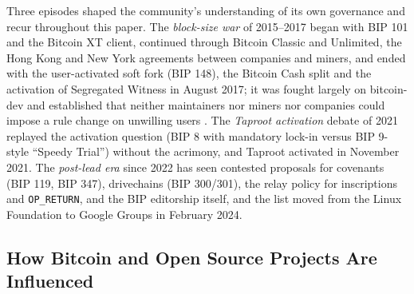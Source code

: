 \documentclass[sigconf,screen]{acmart}
\begin{document}
Three episodes shaped the community's understanding of its own governance and recur throughout this paper. The \emph{block-size war} of 2015--2017 began with BIP 101 and the Bitcoin XT client, continued through Bitcoin Classic and Unlimited, the Hong Kong and New York agreements between companies and miners, and ended with the user-activated soft fork (BIP 148), the Bitcoin Cash split and the activation of Segregated Witness in August 2017; it was fought largely on bitcoin-dev and established that neither maintainers nor miners nor companies could impose a rule change on unwilling users \cite{bier2021, defilippi2016}. The \emph{Taproot activation} debate of 2021 replayed the activation question (BIP 8 with mandatory lock-in versus BIP 9-style ``Speedy Trial'') without the acrimony, and Taproot activated in November 2021. The \emph{post-lead era} since 2022 has seen contested proposals for covenants (BIP 119, BIP 347), drivechains (BIP 300/301), the relay policy for inscriptions and \texttt{OP\_RETURN}, and the BIP editorship itself, and the list moved from the Linux Foundation to Google Groups in February 2024.

\subsection{How Bitcoin and Open Source Projects Are Influenced}
\end{document}

